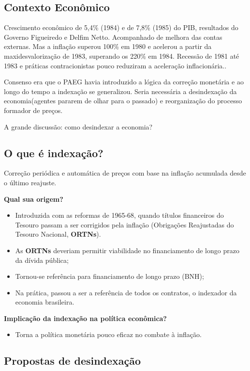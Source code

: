\documentclass[a4paper,12pt]{article}[abntex2]
\begin{document}
\subsection{\textbf{Contexto Econômico}}

Crescimento econômico de 5,4\% (1984) e de 7,8\% (1985) do PIB, resultados do Governo Figueiredo e Delfim Netto. Acompanhado de melhora das contas externas. Mas a inflação superou 100\% em 1980 e acelerou a partir da maxidesvalorização de 1983, superando os 220\% em 1984. Recessão de 1981 até 1983 e práticas contracionistas pouco reduziram a aceleração inflacionária..

Consenso era que o PAEG havia introduzido a lógica da correção monetária e ao longo do tempo a indexação se generalizou. Seria necessária a desindexação da economia(agentes pararem de olhar para o passado) e reorganização do processo formador de preços.

A grande discussão: como desindexar a economia?

\subsection{\textbf{O que é indexação?}}

Correção periódica e automática de preços com base na inflação acumulada desde o último reajuste.

\textbf{Qual sua origem?}\begin{itemize}
    \item Introduzida com as reformas de 1965-68, quando títulos financeiros do Tesouro passam a ser corrigidos pela inflação (Obrigações Reajustadas do Tesouro Nacional, \textbf{ORTNs}).
    \item As \textbf{ORTNs} deveriam permitir viabilidade no financiamento de longo prazo da dívida pública;
    \item Tornou-se referência para financiamento de longo prazo (BNH);
    \item Na prática, passou a ser a referência de todos os contratos, o indexador da economia brasileira.
\end{itemize}

\textbf{Implicação da indexação na política econômica?}\begin{itemize}
    \item Torna a política monetária pouco eficaz no combate à inflação.
\end{itemize}

\subsection{\textbf{Propostas de desindexação}}
\end{document}

